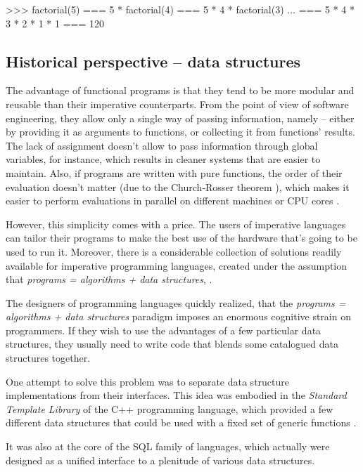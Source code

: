 \begin{Snippet}
  >>> factorial(5)
  === 5 * factorial(4)
  === 5 * 4 * factorial(3)
  ...
  === 5 * 4 * 3 * 2 * 1 * 1
  === 120
\end{Snippet}

\subsection{Historical perspective -- data structures}

The advantage of functional programs is that they tend to be more
modular and reusable than their imperative counterparts. From the
point of view of software engineering, they allow only a single way
of passing information, namely -- either by providing it as arguments to
functions, or collecting it from functions' results. The lack of
assignment doesn't allow to pass information through global variables,
for instance, which results in cleaner systems that are easier
to maintain. Also, if programs are written with pure functions,
the order of their evaluation doesn't matter (due to the
Church-Rosser theorem\cite{Harrison1997} \cite{FelleisenFlatt2006}),
which makes it easier to perform evaluations in parallel on different
machines or CPU cores\cite{Backus1977} \cite{Dybvig1987}.

However, this simplicity comes with a price. The users of
imperative languages can tailor their programs to make the best
use of the hardware that's going to be used to run it. Moreover,
there is a considerable collection of solutions readily available
for imperative programming languages, created under the assumption
that \emph{programs = algorithms + data structures}\cite{Wirth1976},
\cite{CLRS}. 

The designers of programming languages quickly realized, that
the \emph{programs = algorithms + data structures} paradigm
imposes an enormous cognitive strain on programmers. If they
wish to use the advantages of a few particular data structures,
they usually need to write code that blends some catalogued data
structures together.

One attempt to solve this problem was to separate data structure
implementations from their interfaces. This idea was embodied
in the \emph{Standard Template Library} of the C++ programming
language, which provided a few different data structures that
could be used with a fixed set of generic functions\cite{Stroustrup1997}
\cite{Stepanov1986}.

It was also at the core of the SQL family of languages, which
actually were designed as a unified interface to a plenitude
of various data structures.

